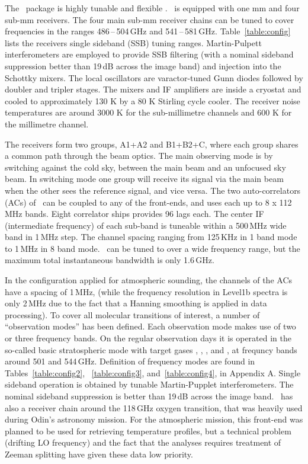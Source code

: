 The \smr\ package is highly tunable and flexible \citep{frisk:theod:03}.
\smr\ is equipped with one mm and four sub-mm receivers.
The four main sub-mm receiver chains can be tuned to cover
frequencies in the ranges 486\,--\,504\,GHz and 541\,--\,581\,GHz.
Table~\ref{table:config} lists the receivers single sideband (SSB) tuning ranges.
Martin-Pulpett interferometers are employed to provide SSB filtering 
(with a nominal sideband suppression better than 19\,dB across
the image band) and injection into the Schottky mixers.
The local oscillators are varactor-tuned Gunn diodes followed by
doubler and tripler stages. The mixers and IF amplifiers are inside a cryostat and
cooled to approximately 130 K by a 80 K Stirling cycle cooler. The receiver
noise temperatures are around 3000 K for
the sub-millimetre channels and 600 K for the millimetre channel.

The receivers form two groups, A1+A2 and B1+B2+C, where each group shares
a common path through the beam optics. 
The main observing mode is by switching against the cold sky, between the
main beam and an unfocused sky beam. In switching mode one group will
receive its signal via the main beam when the other sees the reference signal,
and vice versa.
The two auto-correlators (ACs) of \smr\ can be coupled to any of the front-ends,
and uses each up to 8 x 112 MHz bands.
Eight correlator ships provides 96 lags each.
The center IF (intermediate frequency) of each sub-band is tuneable
within a 500\,MHz wide band in 1\,MHz step. The channel spacing
ranging from 125\,KHz in 1 band mode to 1\,MHz in 8 band mode.
\smr\ can be tuned to over a wide frequency range, but the maximum total instantaneous
bandwidth is only 1.6\,GHz. 

In the configuration applied for
atmospheric sounding, the channels of the ACs have a spacing of 1\,MHz,
(while the frequency resolution in Level1b spectra is only 2\,MHz 
due to the fact that a Hanning smoothing is applied in data processing).
To cover all molecular transitions of interest, a 
number of ``observation modes'' has been defined. Each observation mode makes
use of two or three frequency bands. 
On the regular observation days it is operated in the so-called basic stratospheric 
mode with target gases , , , and ,
at frequncy bands around 501 and 544\,GHz.
Definition of frequency modes are found in Tables~\ref{table:config2}, 
~\ref{table:config3}, and~\ref{table:config4}, in Appendix A.
Single sideband operation is obtained by tunable Martin-Pupplet
interferometers. The nominal sideband suppression is better than 19\,dB across
the image band.
\smr\ has also a receiver chain around the 118\,GHz oxygen transition, that was
heavily used during Odin's astronomy mission. For the atmospheric mission, this
front-end was planned to be used for retrieving temperature profiles, but a
technical problem (drifting LO frequency) and the fact that the analyses
requires treatment of Zeeman splitting have given these data low priority. 


